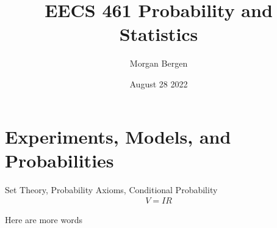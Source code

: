 \documentclass{article}
\title{EECS 461 Probability and Statistics}
\author{Morgan Bergen}
\date{August 28 2022}
\begin{document}
\maketitle
\section{Experiments, Models, and Probabilities}
Set Theory, Probability Axioms, Conditional Probability
\begin{align}
    V = IR \label{eq: thesis contribution 1}
\end{align}

Here are more words
\end{document}
